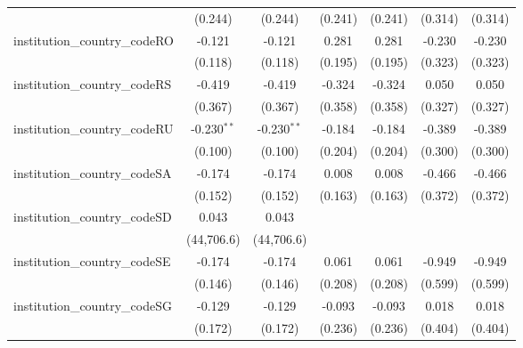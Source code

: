 \begin{tabular}{lcccccc}
                                         & (0.244)        & (0.244)        & (0.241)        & (0.241)        & (0.314)        & (0.314)\\   
   institution\_country\_codeRO          & -0.121         & -0.121         & 0.281          & 0.281          & -0.230         & -0.230\\   
                                         & (0.118)        & (0.118)        & (0.195)        & (0.195)        & (0.323)        & (0.323)\\   
   institution\_country\_codeRS          & -0.419         & -0.419         & -0.324         & -0.324         & 0.050          & 0.050\\   
                                         & (0.367)        & (0.367)        & (0.358)        & (0.358)        & (0.327)        & (0.327)\\   
   institution\_country\_codeRU          & -0.230$^{**}$  & -0.230$^{**}$  & -0.184         & -0.184         & -0.389         & -0.389\\   
                                         & (0.100)        & (0.100)        & (0.204)        & (0.204)        & (0.300)        & (0.300)\\   
   institution\_country\_codeSA          & -0.174         & -0.174         & 0.008          & 0.008          & -0.466         & -0.466\\   
                                         & (0.152)        & (0.152)        & (0.163)        & (0.163)        & (0.372)        & (0.372)\\   
   institution\_country\_codeSD          & 0.043          & 0.043          &                &                &                &   \\   
                                         & (44,706.6)     & (44,706.6)     &                &                &                &   \\   
   institution\_country\_codeSE          & -0.174         & -0.174         & 0.061          & 0.061          & -0.949         & -0.949\\   
                                         & (0.146)        & (0.146)        & (0.208)        & (0.208)        & (0.599)        & (0.599)\\   
   institution\_country\_codeSG          & -0.129         & -0.129         & -0.093         & -0.093         & 0.018          & 0.018\\   
                                         & (0.172)        & (0.172)        & (0.236)        & (0.236)        & (0.404)        & (0.404)\\   

\end{tabular}

